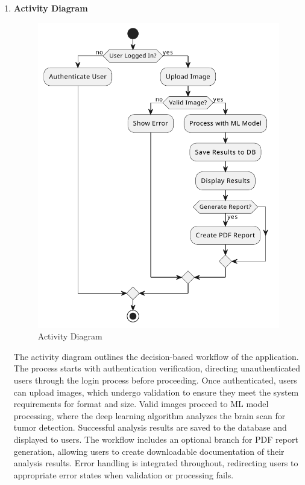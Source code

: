 \begin{enumerate}[label=\roman*.]
    \item \textbf{Activity Diagram}
          \begin{center}
              \begin{figure}[H]
                  \centering
                  \includegraphics[width=0.70\linewidth]{Images/Highlevel/activity.pdf}
                  \caption{Activity Diagram}
                  \label{fig:ActivityDiagram}
              \end{figure}
          \end{center}
          The activity diagram outlines the decision-based workflow of the application. The process starts with authentication verification, directing unauthenticated users through the login process before proceeding. Once authenticated, users can upload images, which undergo validation to ensure they meet the system requirements for format and size. Valid images proceed to ML model processing, where the deep learning algorithm analyzes the brain scan for tumor detection. Successful analysis results are saved to the database and displayed to users. The workflow includes an optional branch for PDF report generation, allowing users to create downloadable documentation of their analysis results. Error handling is integrated throughout, redirecting users to appropriate error states when validation or processing fails.
\end{enumerate}
